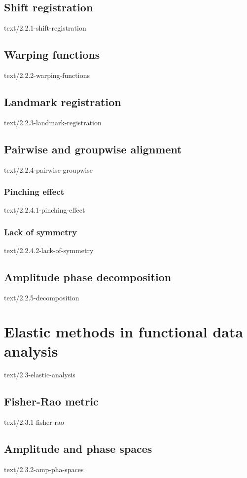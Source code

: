 \documentclass[epsbased,copyleft,final,printable,covers,extendedindex,firstnumbered,tfg, english]{tfgtfmthesisuam}
\begin{document}
    \subsection{Shift registration\label{SEC:SHIFT}}{text/2.2.1-shift-registration}
    \subsection{Warping functions\label{SEC:WARPING}}{text/2.2.2-warping-functions}
    \subsection{Landmark registration\label{SEC:LANDMARK}}{text/2.2.3-landmark-registration}
    \subsection{Pairwise and groupwise alignment\label{SEC:L2PAIRWISE}}{text/2.2.4-pairwise-groupwise}
      \subsubsection{Pinching effect\label{SSEC:PINCHING}}{text/2.2.4.1-pinching-effect}
      \subsubsection{Lack of symmetry\label{SSEC:SIMMETRY}}{text/2.2.4.2-lack-of-symmetry}
    \subsection{Amplitude phase decomposition\label{SEC:DECOMPOSITION}}{text/2.2.5-decomposition}

    \section{Elastic methods in functional data analysis\label{SEC:ELASTIC}}{text/2.3-elastic-analysis}
      \subsection{Fisher-Rao metric\label{SEC:FISHERRAO}}{text/2.3.1-fisher-rao}
      \subsection{Amplitude and phase spaces\label{SEC:AMPPHA}}{text/2.3.2-amp-pha-spaces}
\end{document}
